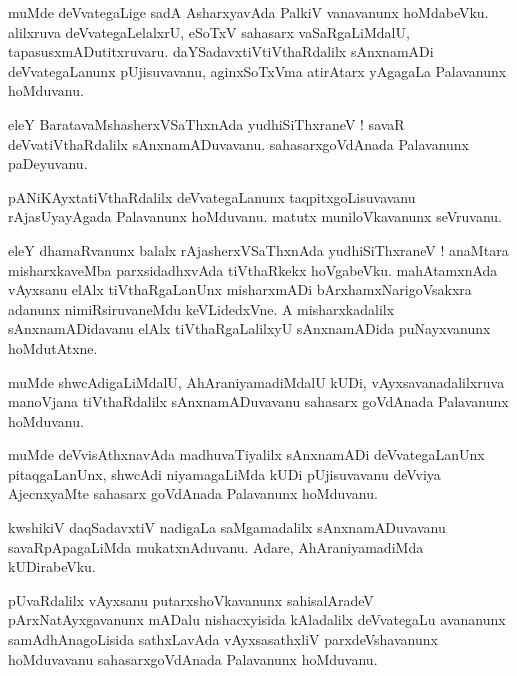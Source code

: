 \documentclass{article}
\begin{document}
\begin{mn}
muMde deVvategaLige sadA AsharxyavAda PalkiV vanavanunx hoMdabeVku. alilxruva 
deVvategaLelalxrU, eSoTxV sahasarx vaSaRgaLiMdalU, tapasusxmADutitxruvaru. 
daYSadavxtiVtiVthaRdalilx sAnxnamADi deVvategaLanunx pUjisuvavanu, aginxSoTxVma atirAtarx 
yAgagaLa Palavanunx hoMduvanu.
\end{mn}

\begin{mn}
eleY BaratavaMshasherxVSaThxnAda yudhiSiThxraneV ! savaR deVvatiVthaRdalilx sAnxnamADuvavanu. 
sahasarxgoVdAnada Palavanunx paDeyuvanu.
\end{mn}

\begin{mn}
pANiKAyxtatiVthaRdalilx deVvategaLanunx taqpitxgoLisuvavanu rAjasUyayAgada Palavanunx hoMduvanu.
matutx muniloVkavanunx seVruvanu.
\end{mn}

\begin{mn}
eleY dhamaRvanunx balalx rAjasherxVSaThxnAda yudhiSiThxraneV ! anaMtara misharxkaveMba 
parxsidadhxvAda tiVthaRkekx hoVgabeVku. mahAtamxnAda vAyxsanu elAlx tiVthaRgaLanUnx misharxmADi
bArxhamxNarigoVsakxra adanunx nimiRsiruvaneMdu keVLidedxVne. A misharxkadalilx sAnxnamADidavanu 
elAlx tiVthaRgaLalilxyU sAnxnamADida puNayxvanunx hoMdutAtxne.
\end{mn}

\begin{mn}
muMde shwcAdigaLiMdalU, AhAraniyamadiMdalU kUDi, vAyxsavanadalilxruva manoVjana tiVthaRdalilx 
sAnxnamADuvavanu sahasarx goVdAnada Palavanunx hoMduvanu.
\end{mn}

\begin{mn}
muMde deVvisAthxnavAda madhuvaTiyalilx sAnxnamADi deVvategaLanUnx pitaqgaLanUnx, shwcAdi 
niyamagaLiMda  kUDi pUjisuvavanu deVviya AjecnxyaMte sahasarx goVdAnada Palavanunx hoMduvanu.
\end{mn}

\begin{mn}
kwshikiV daqSadavxtiV nadigaLa saMgamadalilx sAnxnamADuvavanu savaRpApagaLiMda mukatxnAduvanu. 
Adare, AhAraniyamadiMda kUDirabeVku.
\end{mn}

\begin{mn}
pUvaRdalilx vAyxsanu putarxshoVkavanunx sahisalAradeV pArxNatAyxgavanunx mADalu nishacxyisida 
kAladalilx deVvategaLu avananunx samAdhAnagoLisida sathxLavAda vAyxsasathxliV parxdeVshavanunx
hoMduvavanu sahasarxgoVdAnada Palavanunx hoMduvanu.
\end{mn}
\end{document}
